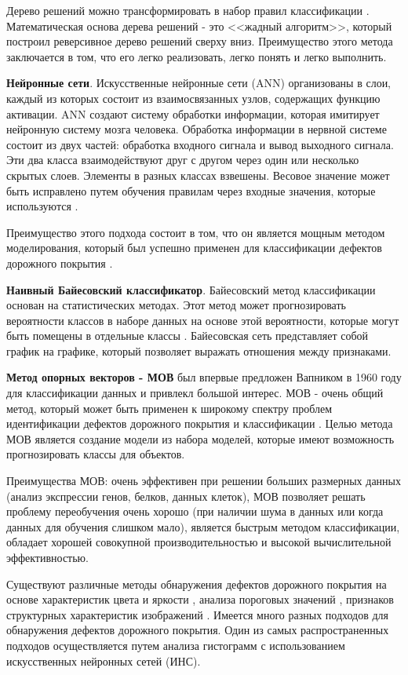 \documentclass[a4paper,14pt]{extreport}
\begin{document}
Дерево решений можно трансформировать в набор правил классификации \cite{h84, h85}. Математическая основа дерева решений - это <<жадный алгоритм>>, который построил реверсивное дерево решений сверху вниз. Преимущество этого метода заключается в том, что его легко реализовать, легко понять и легко выполнить.

\textbf{Нейронные сети}. Искусственные нейронные сети (ANN) организованы в слои, каждый из которых состоит из взаимосвязанных узлов, содержащих функцию активации\cite{h86}. ANN создают систему обработки информации, которая имитирует нейронную систему мозга человека. Обработка информации в нервной системе состоит из двух частей: обработка входного сигнала и вывод выходного сигнала. Эти два класса взаимодействуют друг с другом через один или несколько скрытых слоев. Элементы в разных классах взвешены. Весовое значение может быть исправлено путем обучения правилам через входные значения, которые  используются \cite{h87, h88}. 

Преимущество этого подхода состоит в том, что он является мощным методом моделирования, который был успешно применен для классификации дефектов дорожного покрытия \cite{h92, h93}.

\textbf{Наивный Байесовский классификатор}. Байесовский метод классификации основан на статистических методах. Этот метод может прогнозировать вероятности классов в наборе данных на основе этой вероятности, которые могут быть помещены в отдельные классы \cite{h89, h90}. Байесовская сеть представляет собой график на графике, который позволяет выражать отношения между признаками.

\textbf{Метод опорных векторов - МОВ} \cite{h91} был впервые предложен Вапником в 1960 году для классификации данных и привлекл большой интерес. МОВ - очень общий метод, который может быть применен к широкому спектру проблем идентификации дефектов дорожного покрытия и классификации \cite{h94}. Целью метода МОВ является создание модели из набора моделей, которые имеют возможность прогнозировать классы для объектов.

Преимущества МОВ: очень эффективен при решении больших размерных данных (анализ экспрессии генов, белков, данных клеток), МОВ позволяет решать проблему переобучения очень хорошо (при наличии шума в данных или когда данных для обучения слишком мало), является быстрым методом классификации, обладает хорошей совокупной производительностью и высокой вычислительной эффективностью.

Существуют различные методы обнаружения дефектов дорожного покрытия на основе характеристик цвета и яркости \cite{h66}, анализа пороговых значений \cite{h67}, признаков структурных характеристик изображений \cite{h68}. Имеется много разных подходов для обнаружения дефектов дорожного покрытия. Один из самых распространенных подходов осуществляется путем анализа гистограмм с использованием искусственных нейронных сетей (ИНС). 
\end{document}
